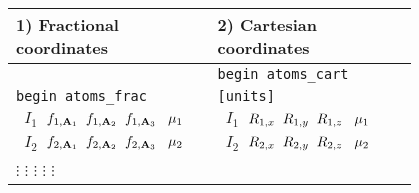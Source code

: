 \documentclass[10pt]{report}
\def\la{\large}
\begin{document}
\begin{itemize}
\begin{center}
    \begin{tabular}{p{0.4\linewidth}p{0.4\linewidth}}
        \toprule
        \multicolumn{1}{l}{\la 1) Fractional coordinates} & \multicolumn{1}{l}{\la 2) Cartesian coordinates} \\ \midrule
                                 & {\tt begin atoms\_cart} \\
         {\tt begin atoms\_frac} & {\tt [units]}                   \\
        {\tt \hspace{0.2cm} $I_{1}$\hspace{0.3cm}  $ f_{1,\textbf{A}_1} \hspace{0.2cm} f_{1,\textbf{A}_2} \hspace{0.2cm} f_{1,\textbf{A}_3} \hspace{0.3cm} \mu_{1} $}  &
        {\tt \hspace{0.2cm} $I_{1}$\hspace{0.3cm}  $ R_{1,x} \hspace{0.2cm} R_{1,y} \hspace{0.2cm} R_{1,z}\hspace{0.3cm} \mu_{1} $}  \\
        {\tt \hspace{0.2cm} $I_{2}$\hspace{0.3cm}  $ f_{2,\textbf{A}_1} \hspace{0.2cm} f_{2,\textbf{A}_2} \hspace{0.2cm} f_{2,\textbf{A}_3} \hspace{0.3cm} \mu_{2} $}  &
        {\tt \hspace{0.2cm} $I_{2}$\hspace{0.3cm}  $ R_{2,x} \hspace{0.2cm} R_{2,y} \hspace{0.2cm} R_{2,z}\hspace{0.3cm} \mu_{2} $}  \\
           \hspace{0.3cm}  $\vdots$ \hspace{0.9cm}    $\vdots$ \hspace{0.45cm} $\vdots$ \hspace{0.45cm} $\vdots$ \hspace{0.55cm} $\vdots$             &   

\end{tabular}
\end{center}
\end{itemize}
\end{document}
